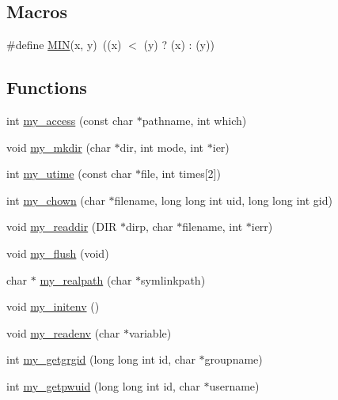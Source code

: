 \subsection*{Macros}
\begin{DoxyCompactItemize}
\item 
\#define \mbox{\hyperlink{C-M__system_8c_a74e75242132eaabbc1c512488a135926}{M\+IN}}(x,  y)~((x) $<$ (y) ? (x) \+: (y))
\end{DoxyCompactItemize}
\subsection*{Functions}
\begin{DoxyCompactItemize}
\item 
int \mbox{\hyperlink{C-M__system_8c_addd32f6d9fc61aa873507167956ac235}{my\+\_\+access}} (const char $\ast$pathname, int which)
\item 
void \mbox{\hyperlink{C-M__system_8c_a21b228b36ba6064c95e68c484f92eaf8}{my\+\_\+mkdir}} (char $\ast$dir, int mode, int $\ast$ier)
\item 
int \mbox{\hyperlink{C-M__system_8c_a5dcb7268b2fb47e193fc6bb9519c6ae6}{my\+\_\+utime}} (const char $\ast$file, int times\mbox{[}2\mbox{]})
\item 
int \mbox{\hyperlink{C-M__system_8c_acfa12de4342c03519fc35d7892db94b2}{my\+\_\+chown}} (char $\ast$filename, long long int uid, long long int gid)
\item 
void \mbox{\hyperlink{C-M__system_8c_a91bcacc76b5a33845775f92e9608ac9c}{my\+\_\+readdir}} (D\+IR $\ast$dirp, char $\ast$filename, int $\ast$ierr)
\item 
void \mbox{\hyperlink{C-M__system_8c_aaf9088f4cc3498dcf1abec624adabe76}{my\+\_\+flush}} (void)
\item 
char $\ast$ \mbox{\hyperlink{C-M__system_8c_a3cdda415df9f1522e545474e11c78a5c}{my\+\_\+realpath}} (char $\ast$symlinkpath)
\item 
void \mbox{\hyperlink{C-M__system_8c_ab5188f2ca99719a14c77a1acae06f93a}{my\+\_\+initenv}} ()
\item 
void \mbox{\hyperlink{C-M__system_8c_a0114eece06797ba0c5e6f5948841501a}{my\+\_\+readenv}} (char $\ast$variable)
\item 
int \mbox{\hyperlink{C-M__system_8c_a13b282e9de0dc0bb29bec1d76aaf6cf0}{my\+\_\+getgrgid}} (long long int id, char $\ast$groupname)
\item 
int \mbox{\hyperlink{C-M__system_8c_a0feb597a044e16699952e0056390f3d6}{my\+\_\+getpwuid}} (long long int id, char $\ast$username)

\end{DoxyCompactItemize}
